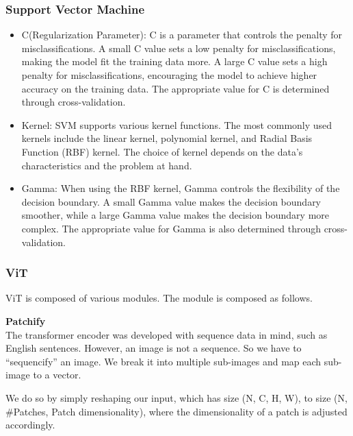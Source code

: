 \subsubsection{\textbf{Support Vector Machine}}
\begin{itemize}
    \item C(Regularization Parameter): C is a parameter that controls the penalty for misclassifications. A small C value sets a low penalty for misclassifications, making the model fit the training data more. A large C value sets a high penalty for misclassifications, encouraging the model to achieve higher accuracy on the training data. The appropriate value for C is determined through cross-validation.
    \item Kernel: SVM supports various kernel functions. The most commonly used kernels include the linear kernel, polynomial kernel, and Radial Basis Function (RBF) kernel. The choice of kernel depends on the data's characteristics and the problem at hand.
    \item Gamma: When using the RBF kernel, Gamma controls the flexibility of the decision boundary. A small Gamma value makes the decision boundary smoother, while a large Gamma value makes the decision boundary more complex. The appropriate value for Gamma is also determined through cross-validation.
\end{itemize}

\subsubsection{\textbf{ViT}}
\cite{vision-transformers-medium}
ViT is composed of various modules. The module is composed as follows.

\textbf{Patchify} \\
The transformer encoder was developed with sequence data in mind, such as English sentences. However, an image is not a sequence. So we have to “sequencify” an image. We break it into multiple sub-images and map each sub-image to a vector.

We do so by simply reshaping our input, which has size (N, C, H, W), to size (N, \#Patches, Patch dimensionality), where the dimensionality of a patch is adjusted accordingly.

